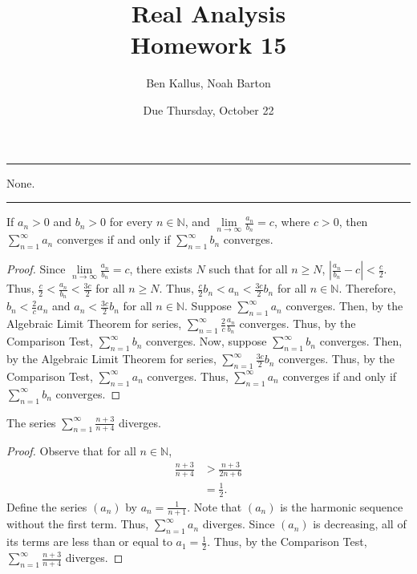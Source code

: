 \documentclass[12pt]{article}
\title{Real Analysis \\ Homework 15}
\author{Ben Kallus, Noah Barton}
\date{Due Thursday, October 22}
\begin{document}
\maketitle

\hrule
\bigskip

 None.

\bigskip
\hrule
\bigskip

 If $a_n > 0$ and $b_n > 0$ for every $n \in \mathbb N$, and $\lim\limits_{n\to\infty}\frac{a_n}{b_n}=c$, where $c > 0$, then $\sum\limits_{n=1}^\infty a_n$ converges if and only if $\sum\limits_{n=1}^\infty b_n$ converges.
\begin{proof}
    Since $\lim\limits_{n\to\infty}\frac{a_n}{b_n} = c$, there exists $N$ such that for all $n \geq N$, $\left|\frac{a_n}{b_n} - c\right| < \frac c2$. Thus, $\frac c2 < \frac{a_n}{b_n} < \frac{3c}2$ for all $n \geq N$. Thus, $\frac c2 b_n < a_n < \frac{3c}2 b_n$ for all $n \in \mathbb N$. Therefore, $b_n < \frac 2c a_n$ and $a_n < \frac{3c}2 b_n$ for all $n \in \mathbb N$. Suppose $\sum\limits_{n=1}^\infty a_n$ converges. Then, by the Algebraic Limit Theorem for series, $\sum\limits_{n=1}^\infty \frac2c\frac{a_n}{b_n}$ converges. Thus, by the Comparison Test, $\sum\limits_{n=1}^\infty b_n$ converges. Now, suppose $\sum\limits_{n=1}^\infty b_n$ converges. Then, by the Algebraic Limit Theorem for series, $\sum\limits_{n=1}^\infty \frac{3c}2 b_n$ converges. Thus, by the Comparison Test, $\sum\limits_{n=1}^\infty a_n$ converges. Thus, $\sum\limits_{n=1}^\infty a_n$ converges if and only if $\sum\limits_{n=1}^\infty b_n$ converges.
\end{proof}

\newpage
{}

 The series $\sum\limits_{n=1}^\infty \frac{n+3}{n+4}$ diverges.
\begin{proof}
    Observe that for all $n \in \mathbb N$,
    \begin{align*}
        \frac{n+3}{n+4} &> \frac{n+3}{2n+6} \\
                        &= \frac12.
    \end{align*}
    Define the series $(a_n)$ by $a_n = \frac1{n+1}$. Note that $(a_n)$ is the harmonic sequence without the first term. Thus, $\sum\limits_{n=1}^\infty a_n$ diverges. Since $(a_n)$ is decreasing, all of its terms are less than or equal to $a_1 = \frac12$. Thus, by the Comparison Test, $\sum\limits_{n=1}^\infty \frac{n+3}{n+4}$ diverges.
\end{proof}
\end{document}
